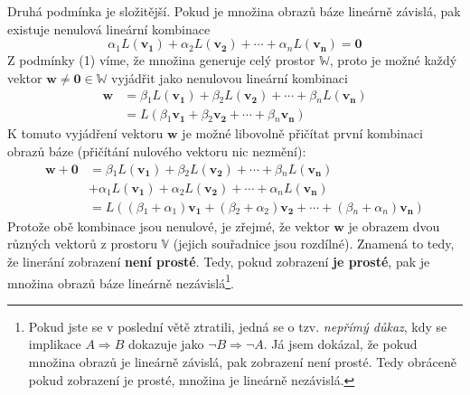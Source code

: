 \documentclass[a5paper,12pt]{amsbook}
\theoremstyle{definition}
\newcommand{\myscalar}[1]{#1}
\newcommand{\myvec}[1]{\mathbf{#1}}
\newcommand{\myspace}[1]{\mathbb{#1}}
\newcommand{\mymap}[1]{#1}
\begin{document}
Druhá podmínka je složitější. Pokud je množina obrazů báze lineárně závislá, pak existuje
nenulová lineární kombinace
\begin{equation*}
\myscalar{\alpha{}_1}\mymap{L}(\myvec{v_1}) + \myscalar{\alpha{}_2}\mymap{L}(\myvec{v_2}) 
  + \cdots + \myscalar{\alpha{}_n}\mymap{L}(\myvec{v_n}) = \myvec{0}
\end{equation*}
 Z podmínky (1) víme, že množina generuje celý prostor $\myspace{W}$, proto je
možné každý vektor $\myvec{w}\neq\myvec{0}\in\myspace{W}$ vyjádřit jako nenulovou lineární kombinaci
\begin{equation*}
\begin{split}
\myvec{w} &= \myscalar{\beta{}_1}\mymap{L}(\myvec{v_1}) + \myscalar{\beta{}_2}\mymap{L}(\myvec{v_2}) 
  + \cdots + \myscalar{\beta{}_n}\mymap{L}(\myvec{v_n}) \\
&= \mymap{L}(\myscalar{\beta{}_1}\myvec{v_1} + \myscalar{\beta{}_2}\myvec{v_2} 
  + \cdots + \myscalar{\beta{}_n}\myvec{v_n})
\end{split}
\end{equation*}
K tomuto vyjádření vektoru $\myvec{w}$ je možné libovolně přičítat první kombinaci obrazů báze
(přičítání nulového vektoru nic nezmění):
\begin{equation*}
\begin{split}
\myvec{w} + \myvec{0} &= \myscalar{\beta{}_1}\mymap{L}(\myvec{v_1}) 
  + \myscalar{\beta{}_2}\mymap{L}(\myvec{v_2}) + \cdots + \myscalar{\beta{}_n}\mymap{L}(\myvec{v_n}) \\
  &+ \myscalar{\alpha{}_1}\mymap{L}(\myvec{v_1}) + \myscalar{\alpha{}_2}\mymap{L}(\myvec{v_2}) 
  + \cdots + \myscalar{\alpha{}_n}\mymap{L}(\myvec{v_n}) \\
&= \mymap{L}((\myscalar{\beta{}_1} + \myscalar{\alpha{}_1})\myvec{v_1} 
  + (\myscalar{\beta{}_2} + \myscalar{\alpha{}_2})\myvec{v_2} 
  + \cdots + (\myscalar{\beta{}_n} + \myscalar{\alpha{}_n})\myvec{v_n})
\end{split}
\end{equation*}
Protože obě kombinace jsou nenulové, je zřejmé, že vektor $\myvec{w}$ je obrazem dvou různých
vektorů z prostoru $\myspace{V}$ (jejich souřadnice jsou rozdílné). Znamená to tedy, že
linerání zobrazení \textbf{není prosté}. Tedy, pokud zobrazení \textbf{je prosté}, pak je množina
obrazů báze lineárně nezávislá\footnote{
  Pokud jste se v poslední větě ztratili, jedná se o tzv. \textit{nepřímý důkaz}, kdy se
  implikace $A\Rightarrow B$ dokazuje jako $\lnot B\Rightarrow\lnot A$. Já jsem dokázal, že pokud
  množina obrazů je lineárně závislá, pak zobrazení není prosté. Tedy obráceně pokud zobrazení
  je prosté, množina je lineárně nezávislá.
}.
\end{document}
